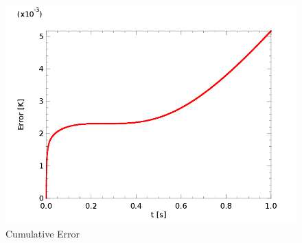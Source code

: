 \documentclass[12pt,twocolumn]{article}
\begin{document}
\begin{figure}
\label{fig:timeerrror}
\includegraphics[width=\columnwidth]{plot/timeerror.png}
\footnotesize{\caption{Cumulative Error}}
\end{figure}
\end{document}
